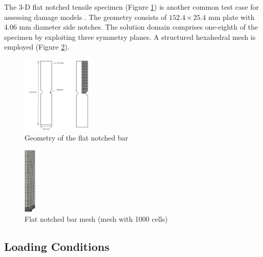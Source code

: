 \documentclass[sn-mathphys,Numbered,draft]{sn-jnl}%
\begin{document}
The 3-D flat notched tensile specimen (Figure \ref{fig:flat_bar_geom}) is another common test case for assessing damage models \citep{borden_phase-field_2016, eldahshan_phase_2021}.
The geometry consists of $152.4 \times 25.4$ \si{\milli\meter} plate with 4.06 \si{\milli\meter} diameter side notches.
The solution domain comprises one-eighth of the specimen by exploiting three symmetry planes.
A structured hexahedral mesh is employed (Figure \ref{fig:flat_bar_mesh}).

\begin{figure}[htb] \label{fig:flat_bar_geom}
\begin{center}
	\includegraphics[width=0.3\textwidth]{./Figures/finiteVolumeImplementation/inhomogenousDeformation/flatNotchedTensile.png}
\caption{Geometry of the flat notched bar}
\end{center}
\end{figure}

\begin{figure}[htbp]
	\centering
		\includegraphics[width=0.05\textwidth]{./Figures/finiteVolumeImplementation/inhomogenousDeformation/bordenMesh.png}
		
		
		\caption{Flat notched bar mesh (mesh with 1000 cells)}
	\label{fig:flat_bar_mesh}
\end{figure}




\subsection{Loading Conditions}
\end{document}
